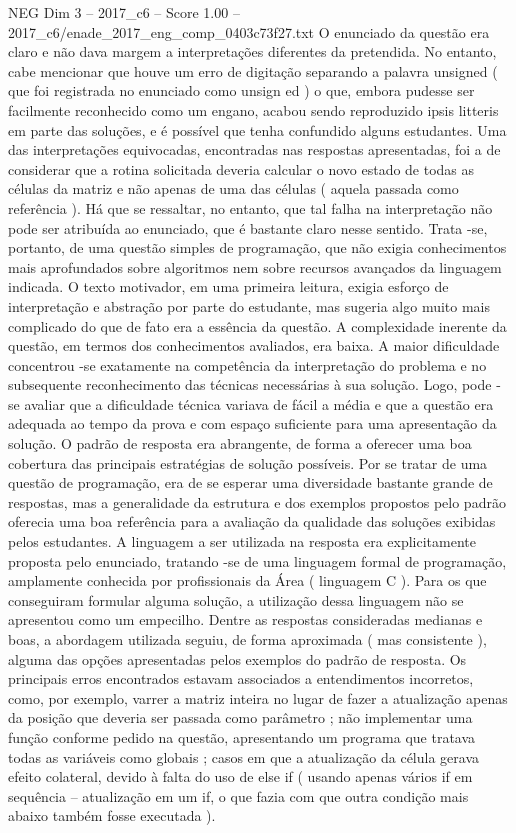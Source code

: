 \begin{textsample}{NEG Dim 3 – 2017\_c6 – Score 1.00 – 2017\_c6/enade\_2017\_eng\_comp\_0403c73f27.txt}
O enunciado da questão era claro e não dava margem a interpretações diferentes da pretendida.
No entanto, cabe mencionar que houve um erro de digitação separando a palavra unsigned ( que foi registrada no enunciado como unsign ed ) o que, embora pudesse ser facilmente reconhecido como um engano, acabou sendo reproduzido ipsis litteris em parte das soluções, e é possível que tenha confundido alguns estudantes.
Uma das interpretações equivocadas, encontradas nas respostas apresentadas, foi a de considerar que a rotina solicitada deveria calcular o novo estado de todas as células da matriz e não apenas de uma das células ( aquela passada como referência ).
Há que se ressaltar, no entanto, que tal falha na interpretação não pode ser atribuída ao enunciado, que é bastante claro nesse sentido.
Trata -se, portanto, de uma questão simples de programação, que não exigia conhecimentos mais aprofundados sobre algoritmos nem sobre recursos avançados da linguagem indicada.
O texto motivador, em uma primeira leitura, exigia esforço de interpretação e abstração por parte do estudante, mas sugeria algo muito mais complicado do que de fato era a essência da questão.
A complexidade inerente da questão, em termos dos conhecimentos avaliados, era baixa.
A maior dificuldade concentrou -se exatamente na competência da interpretação do problema e no subsequente reconhecimento das técnicas necessárias à sua solução.
Logo, pode -se avaliar que a dificuldade técnica variava de fácil a média e que a questão era adequada ao tempo da prova e com espaço suficiente para uma apresentação da solução.
O padrão de resposta era abrangente, de forma a oferecer uma boa cobertura das principais estratégias de solução possíveis.
Por se tratar de uma questão de programação, era de se esperar uma diversidade bastante grande de respostas, mas a generalidade da estrutura e dos exemplos propostos pelo padrão oferecia uma boa referência para a avaliação da qualidade das soluções exibidas pelos estudantes.
A linguagem a ser utilizada na resposta era explicitamente proposta pelo enunciado, tratando -se de uma linguagem formal de programação, amplamente conhecida por profissionais da Área ( linguagem C ).
Para os que conseguiram formular alguma solução, a utilização dessa linguagem não se apresentou como um empecilho.
Dentre as respostas consideradas medianas e boas, a abordagem utilizada seguiu, de forma aproximada ( mas consistente ), alguma das opções apresentadas pelos exemplos do padrão de resposta.
Os principais erros encontrados estavam associados a entendimentos incorretos, como, por exemplo, varrer a matriz inteira no lugar de fazer a atualização apenas da posição que deveria ser passada como parâmetro ; não implementar uma função conforme pedido na questão, apresentando um programa que tratava todas as variáveis como globais ; casos em que a atualização da célula gerava efeito colateral, devido à falta do uso de else if ( usando apenas vários if em sequência – atualização em um if, o que fazia com que outra condição mais abaixo também fosse executada ).

\end{textsample}
